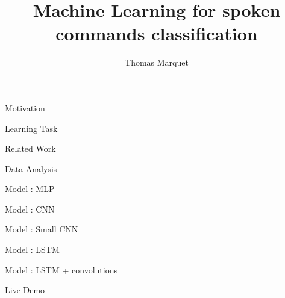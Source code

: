 \documentclass{beamer}
\title{Machine Learning for spoken commands classification}
\author{Thomas Marquet}
\begin{document}
	
	\begin{frame}
		\titlepage
	\end{frame}
	
	\begin{frame}{Motivation} 

	\end{frame}

	\begin{frame}{Learning Task} 

	\end{frame}

	\begin{frame}{Related Work} 

	\end{frame}
	
	\begin{frame}{Data Analysis} 

	\end{frame}
	
	\begin{frame}{Model : MLP}

	\end{frame}

	\begin{frame}{Model : CNN}

	\end{frame}
	\begin{frame}{Model : Small CNN}

	\end{frame}	
	
	\begin{frame}{Model : LSTM}

	\end{frame}	
	
	\begin{frame}{Model : LSTM + convolutions}

	\end{frame}

	\begin{frame}{Live Demo}

	\end{frame}	
	
\end{document}
